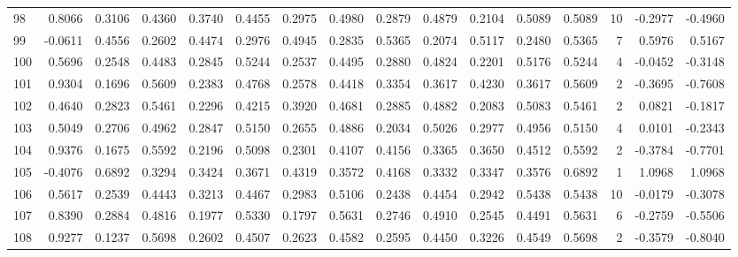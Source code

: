 \begin{tabular}{lrrrrrrrrrrrrrrr}
98  &      0.8066 &  0.3106 &  0.4360 &  0.3740 &  0.4455 &  0.2975 &  0.4980 &  0.2879 &  0.4879 &  0.2104 &   0.5089 &     0.5089 &     10 &                   -0.2977 &                    -0.4960 \\
99  &     -0.0611 &  0.4556 &  0.2602 &  0.4474 &  0.2976 &  0.4945 &  0.2835 &  0.5365 &  0.2074 &  0.5117 &   0.2480 &     0.5365 &      7 &                    0.5976 &                     0.5167 \\
100 &      0.5696 &  0.2548 &  0.4483 &  0.2845 &  0.5244 &  0.2537 &  0.4495 &  0.2880 &  0.4824 &  0.2201 &   0.5176 &     0.5244 &      4 &                   -0.0452 &                    -0.3148 \\
101 &      0.9304 &  0.1696 &  0.5609 &  0.2383 &  0.4768 &  0.2578 &  0.4418 &  0.3354 &  0.3617 &  0.4230 &   0.3617 &     0.5609 &      2 &                   -0.3695 &                    -0.7608 \\
102 &      0.4640 &  0.2823 &  0.5461 &  0.2296 &  0.4215 &  0.3920 &  0.4681 &  0.2885 &  0.4882 &  0.2083 &   0.5083 &     0.5461 &      2 &                    0.0821 &                    -0.1817 \\
103 &      0.5049 &  0.2706 &  0.4962 &  0.2847 &  0.5150 &  0.2655 &  0.4886 &  0.2034 &  0.5026 &  0.2977 &   0.4956 &     0.5150 &      4 &                    0.0101 &                    -0.2343 \\
104 &      0.9376 &  0.1675 &  0.5592 &  0.2196 &  0.5098 &  0.2301 &  0.4107 &  0.4156 &  0.3365 &  0.3650 &   0.4512 &     0.5592 &      2 &                   -0.3784 &                    -0.7701 \\
105 &     -0.4076 &  0.6892 &  0.3294 &  0.3424 &  0.3671 &  0.4319 &  0.3572 &  0.4168 &  0.3332 &  0.3347 &   0.3576 &     0.6892 &      1 &                    1.0968 &                     1.0968 \\
106 &      0.5617 &  0.2539 &  0.4443 &  0.3213 &  0.4467 &  0.2983 &  0.5106 &  0.2438 &  0.4454 &  0.2942 &   0.5438 &     0.5438 &     10 &                   -0.0179 &                    -0.3078 \\
107 &      0.8390 &  0.2884 &  0.4816 &  0.1977 &  0.5330 &  0.1797 &  0.5631 &  0.2746 &  0.4910 &  0.2545 &   0.4491 &     0.5631 &      6 &                   -0.2759 &                    -0.5506 \\
108 &      0.9277 &  0.1237 &  0.5698 &  0.2602 &  0.4507 &  0.2623 &  0.4582 &  0.2595 &  0.4450 &  0.3226 &   0.4549 &     0.5698 &      2 &                   -0.3579 &                    -0.8040 \\

\end{tabular}

